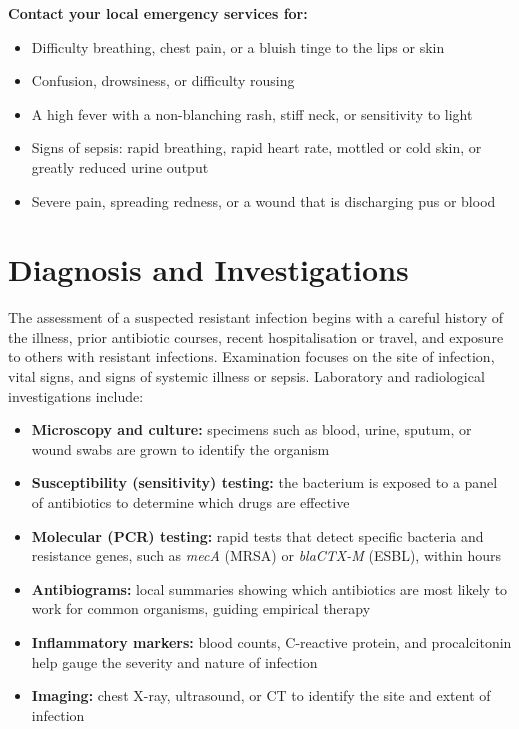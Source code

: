 \textbf{Contact your local emergency services for:}
\begin{itemize}
    \item Difficulty breathing, chest pain, or a bluish tinge to the lips or skin
    \item Confusion, drowsiness, or difficulty rousing
    \item A high fever with a non-blanching rash, stiff neck, or sensitivity to light
    \item Signs of sepsis: rapid breathing, rapid heart rate, mottled or cold skin, or greatly reduced urine output
    \item Severe pain, spreading redness, or a wound that is discharging pus or blood
\end{itemize}

\section*{Diagnosis and Investigations}
The assessment of a suspected resistant infection begins with a careful history of the illness, prior antibiotic courses, recent hospitalisation or travel, and exposure to others with resistant infections. Examination focuses on the site of infection, vital signs, and signs of systemic illness or sepsis. Laboratory and radiological investigations include:

\begin{itemize}
    \item \textbf{Microscopy and culture:} specimens such as blood, urine, sputum, or wound swabs are grown to identify the organism
    \item \textbf{Susceptibility (sensitivity) testing:} the bacterium is exposed to a panel of antibiotics to determine which drugs are effective
    \item \textbf{Molecular (PCR) testing:} rapid tests that detect specific bacteria and resistance genes, such as \textit{mecA} (MRSA) or \textit{blaCTX-M} (ESBL), within hours
    \item \textbf{Antibiograms:} local summaries showing which antibiotics are most likely to work for common organisms, guiding empirical therapy
    \item \textbf{Inflammatory markers:} blood counts, C-reactive protein, and procalcitonin help gauge the severity and nature of infection
    \item \textbf{Imaging:} chest X-ray, ultrasound, or CT to identify the site and extent of infection
\end{itemize}


